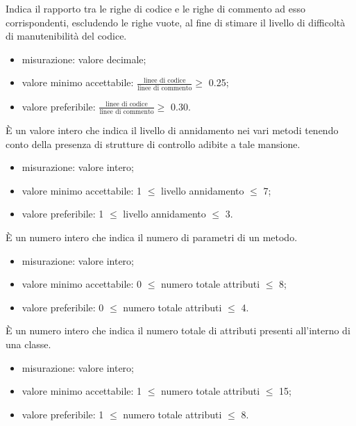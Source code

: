 		Indica il rapporto tra le righe di codice e le righe di commento ad esso corrispondenti, escludendo le righe vuote, al fine di stimare il livello di difficoltà di manutenibilità del codice. 	
		\begin{itemize}
			\item{misurazione: valore decimale;}
			\item{valore minimo accettabile: $\displaystyle\frac{\mbox{linee di codice}}{\mbox{linee di commento}} \geq$ 0.25;}
			\item{valore preferibile: $\displaystyle\frac{\mbox{linee di codice}}{\mbox{linee di commento}} \geq$ 0.30.}
		\end{itemize}

		È un valore intero che indica il livello di annidamento nei vari metodi tenendo conto della presenza di strutture di controllo adibite a tale mansione.		
		\begin{itemize}
			\item{misurazione: valore intero;}
			\item{valore minimo accettabile: 1 $\leq$ livello annidamento $\leq$ 7;}
			\item{valore preferibile: 1 $\leq$ livello annidamento $\leq$ 3.}
		\end{itemize}
			
		È un numero intero che indica il numero di parametri di un metodo. 
		\begin{itemize}
			\item{misurazione: valore intero;}
			\item{valore minimo accettabile: 0 $\leq$ numero totale attributi $\leq$ 8;}
			\item{valore preferibile: 0 $\leq$ numero totale attributi $\leq$ 4.}
		\end{itemize}
			
		È un numero intero che indica il numero totale di attributi presenti all'interno di una classe.				\begin{itemize}
			\item{misurazione: valore intero;}
			\item{valore minimo accettabile: 1 $\leq$ numero totale attributi $\leq$ 15;}
			\item{valore preferibile: 1 $\leq$ numero totale attributi $\leq$ 8.}
		\end{itemize}

